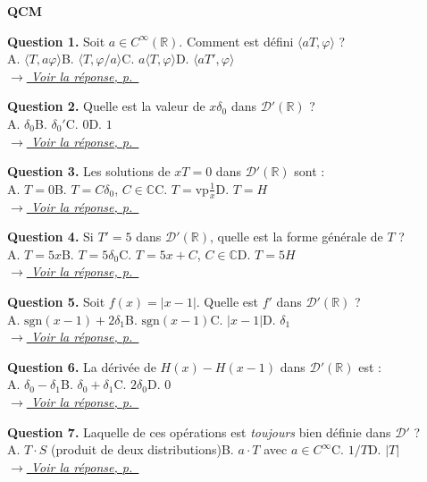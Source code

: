 \documentclass[12pt,a4paper,openany]{book}
\theoremstyle{definition}
\theoremstyle{plain}
\theoremstyle{remark}
\newenvironment{qcmblock}{%
	\begin{mdframed}[linewidth=0.5pt, linecolor=black!35,
		backgroundcolor=gray!5,
		skipabove=12pt, skipbelow=12pt,
		innerleftmargin=12pt, innerrightmargin=8pt,
		innertopmargin=8pt, innerbottommargin=8pt]%
		\noindent\textbf{\scshape QCM}\par\smallskip%
	}{%
	\end{mdframed}%
}
\newcommand{\navtoQCMRep}[2]{%
	\vspace{2pt}%
	\noindent\hfill{\small\itshape%
		\hyperlink{qcmrep:#1:q#2}{$\rightarrow$ Voir la réponse, p.~\pageref*{qcmrep:#1:q#2}}%
	}%
	\vspace{6pt}%
}
\begin{document}
	\begin{qcmblock}
		\hypertarget{qcm:ch5:start}{}\label{qcm:ch5:start}
		\hypertarget{qcm:ch5:q1}{}\label{qcm:ch5:q1}
		\textbf{Question 1.} Soit $a \in C^\infty(\mathbb{R})$. Comment est défini $\langle aT, \varphi \rangle$ ?\\
		A. $\langle T, a\varphi \rangle$\quad B. $\langle T, \varphi/a \rangle$\quad C. $a\langle T, \varphi \rangle$\quad D. $\langle aT', \varphi \rangle$\\
		\navtoQCMRep{ch5}{1}
		
		\medskip
		\hypertarget{qcm:ch5:q2}{}\label{qcm:ch5:q2}
		\textbf{Question 2.} Quelle est la valeur de $x\delta_0$ dans $\mathcal{D}'(\mathbb{R})$ ?\\
		A. $\delta_0$\quad B. $\delta_0'$\quad C. $0$\quad D. $1$\\
		\navtoQCMRep{ch5}{2}
		
		\medskip
		\hypertarget{qcm:ch5:q3}{}\label{qcm:ch5:q3}
		\textbf{Question 3.} Les solutions de $xT = 0$ dans $\mathcal{D}'(\mathbb{R})$ sont :\\
		A. $T = 0$\quad B. $T = C\delta_0$, $C \in \mathbb{C}$\quad C. $T = \mathrm{vp}\frac{1}{x}$\quad D. $T = H$\\
		\navtoQCMRep{ch5}{3}
		
		\medskip
		\hypertarget{qcm:ch5:q4}{}\label{qcm:ch5:q4}
		\textbf{Question 4.} Si $T' = 5$ dans $\mathcal{D}'(\mathbb{R})$, quelle est la forme générale de $T$ ?\\
		A. $T = 5x$\quad B. $T = 5\delta_0$\quad C. $T = 5x + C$, $C \in \mathbb{C}$\quad D. $T = 5H$\\
		\navtoQCMRep{ch5}{4}
		
		\medskip
		\hypertarget{qcm:ch5:q5}{}\label{qcm:ch5:q5}
		\textbf{Question 5.} Soit $f(x) = |x-1|$. Quelle est $f'$ dans $\mathcal{D}'(\mathbb{R})$ ?\\
		A. $\mathrm{sgn}(x-1) + 2\delta_1$\quad B. $\mathrm{sgn}(x-1)$\quad C. $|x-1|$\quad D. $\delta_1$\\
		\navtoQCMRep{ch5}{5}
		
		\medskip
		\hypertarget{qcm:ch5:q6}{}\label{qcm:ch5:q6}
		\textbf{Question 6.} La dérivée de $H(x) - H(x-1)$ dans $\mathcal{D}'(\mathbb{R})$ est :\\
		A. $\delta_0 - \delta_1$\quad B. $\delta_0 + \delta_1$\quad C. $2\delta_0$\quad D. $0$\\
		\navtoQCMRep{ch5}{6}
		
		\medskip
		\hypertarget{qcm:ch5:q7}{}\label{qcm:ch5:q7}
		\textbf{Question 7.} Laquelle de ces opérations est \emph{toujours} bien définie dans $\mathcal{D}'$ ?\\
		A. $T \cdot S$ (produit de deux distributions)\quad B. $a \cdot T$ avec $a \in C^\infty$\quad C. $1/T$\quad D. $|T|$\\
		\navtoQCMRep{ch5}{7}
		

\end{qcmblock}
\end{document}
